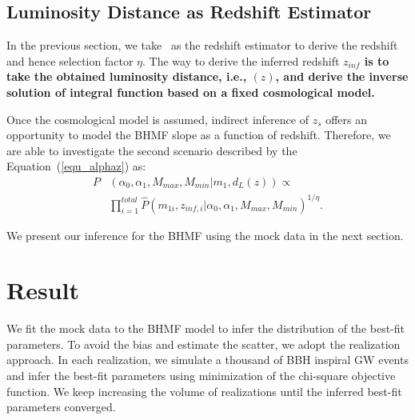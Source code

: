 \documentclass[twocolumn]{aastex62}
\newcommand{\blue}[1]{{#1}}
\begin{document}
\subsection{Luminosity Distance as Redshift Estimator} 
\label{sec_dl_z}
In the previous section, we take \dl\ as the redshift estimator to derive the redshift and hence selection factor $\eta$. The way to derive the inferred redshift {\bf $z_{inf}$ is to take the obtained luminosity distance, i.e.,  \dl$(z)$, and derive the inverse solution of integral function based on a fixed cosmological model.}

Once the cosmological model is assumed, indirect inference of $z_s$ offers an opportunity to model the BHMF slope as a function of redshift. Therefore, we are able to investigate the second scenario described by the Equation~(\ref{equ_alphaz}) as:
 \begin{equation} \label{equ_lik_alphaz}
 \begin{split}
 P&(\alpha_0, \alpha_1, M_{max}, M_{min}|m_{1},d_L(z)) \propto \\
  &\prod_{i=1}^{total} \hat{P}(m_{1i}, z_{inf,i} |\alpha_0, \alpha_1, M_{max}, M_{min})^{1/\eta}.
  \end{split}
 \end{equation}
 
 We present our inference for the BHMF using the mock data in the next section. 


\vspace{1cm}
\section{Result}\label{sec_result}
We fit the mock data to the BHMF model to infer the distribution of the best-fit parameters. To avoid the bias and estimate the scatter, we adopt the realization approach. In each realization, we simulate a thousand of BBH inspiral GW events and infer the best-fit parameters using minimization of the chi-square objective function. \blue{We keep increasing the volume of realizations until the inferred best-fit parameters converged.}
\end{document}
